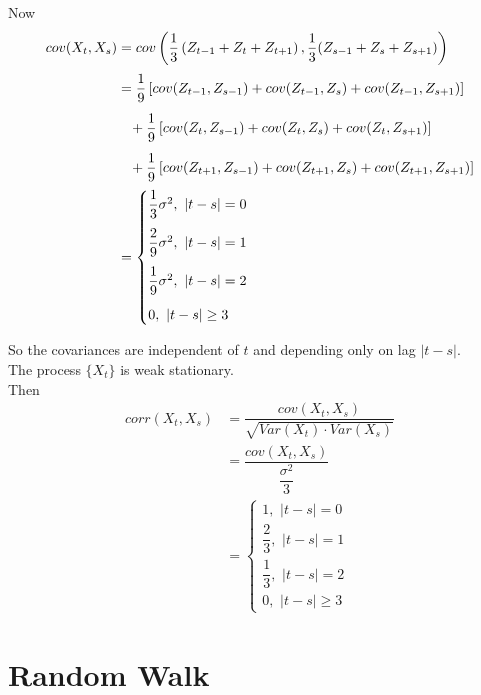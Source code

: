 \documentclass[11pt, a4paper]{article}
\begin{document}
Now
\begin{align*}
cov(X_t, X_s) &= cov\left(\dfrac{1}{3}\left(Z_{t-1} + Z_t + Z_{t+1}\right), \dfrac{1}{3}(Z_{s-1} + Z_s + Z_{s+1})\right) \\[0.25em]
&= \dfrac{1}{9} \left[ cov(Z_{t-1}, Z_{s-1}) + cov(Z_{t-1}, Z_{s}) + cov(Z_{t-1}, Z_{s+1}) \right] \\[0.45em]
&\hspace{0.3cm} + \dfrac{1}{9} \left[ cov(Z_{t}, Z_{s-1}) + cov(Z_{t}, Z_{s}) + cov(Z_{t}, Z_{s+1}) \right] \\[0.45em]
&\hspace{0.3cm} + \dfrac{1}{9} \left[ cov(Z_{t+1}, Z_{s-1}) + cov(Z_{t+1}, Z_{s}) + cov(Z_{t+1}, Z_{s+1}) \right] \\[0.25em]
&= \begin{cases}
\dfrac{1}{3} \sigma^2, \,\, |t-s| = 0 \\[1em]
\dfrac{2}{9} \sigma^2, \,\, |t-s| = 1 \\[1em]
\dfrac{1}{9} \sigma^2, \,\, |t-s| = 2 \\[1em]
0, \,\, |t-s| \geq 3
\end{cases}
\end{align*}

\therefore \hspace{0.1cm} So the covariances are independent of $t$ and depending only on lag $|t-s|$. \\

\Rightarrow \hspace{0.1cm} The process $\{X_t\}$ is weak stationary. \\

Then
\begin{align*}
corr(X_t, X_s) &= \dfrac{cov(X_t, X_s)}{\sqrt{Var(X_t) \cdot Var(X_s)}} \\[0.25em]
&= \dfrac{cov(X_t, X_s)}{\dfrac{\sigma^2}{3}} \\[0.25em]
&= \begin{cases}
1, \,\, |t-s| = 0 \\[1em]
\dfrac{2}{3}, \,\, |t-s| = 1 \\[1em]
\dfrac{1}{3}, \,\, |t-s| = 2 \\[1em]
0, \,\, |t-s| \geq 3
\end{cases}
\end{align*}

\section{Random Walk}
\end{document}
